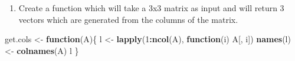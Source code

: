 \documentclass[]{article}
\newenvironment{Shaded}{\begin{snugshade}}{\end{snugshade}}
\newcommand{\ControlFlowTok}[1]{\textcolor[rgb]{0.13,0.29,0.53}{\textbf{#1}}}
\newcommand{\DecValTok}[1]{\textcolor[rgb]{0.00,0.00,0.81}{#1}}
\newcommand{\KeywordTok}[1]{\textcolor[rgb]{0.13,0.29,0.53}{\textbf{#1}}}
\newcommand{\NormalTok}[1]{#1}
\newcommand{\OperatorTok}[1]{\textcolor[rgb]{0.81,0.36,0.00}{\textbf{#1}}}
\newcommand{\StringTok}[1]{\textcolor[rgb]{0.31,0.60,0.02}{#1}}
\providecommand{\tightlist}{%
  \setlength{\itemsep}{0pt}\setlength{\parskip}{0pt}}
\begin{document}
\begin{enumerate}
\def\labelenumi{\arabic{enumi}.}
\setcounter{enumi}{9}
\tightlist
\item
  Create a function which will take a 3x3 matrix as input and will
  return 3 vectors which are generated from the columns of the matrix.
\end{enumerate}

\begin{Shaded}
\begin{Highlighting}[]
\NormalTok{get.cols <-}\StringTok{ }\ControlFlowTok{function}\NormalTok{(A)\{}
\NormalTok{  l <-}\StringTok{ }\KeywordTok{lapply}\NormalTok{(}\DecValTok{1}\OperatorTok{:}\KeywordTok{ncol}\NormalTok{(A), }\ControlFlowTok{function}\NormalTok{(i) A[, i])}
  \KeywordTok{names}\NormalTok{(l) <-}\StringTok{ }\KeywordTok{colnames}\NormalTok{(A)}
\NormalTok{  l}
\NormalTok{\}}
\end{Highlighting}
\end{Shaded}
\end{document}
